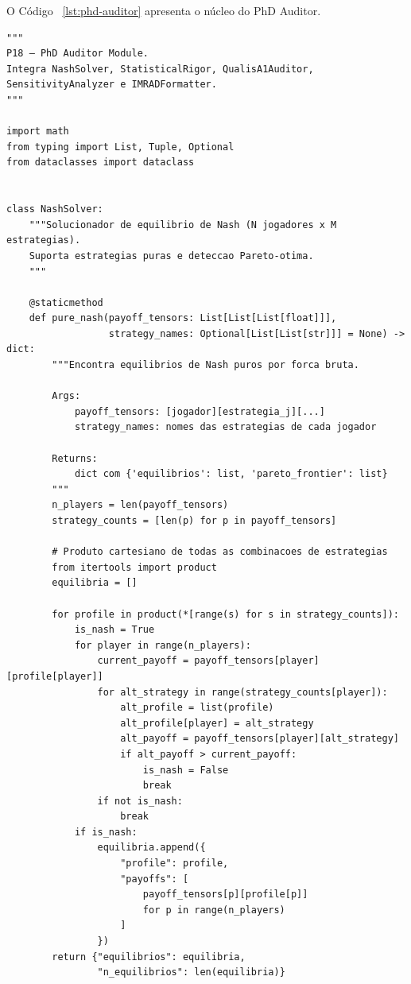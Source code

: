 O Código~ \ref{lst:phd-auditor} apresenta o núcleo do PhD Auditor.

\begin{lstlisting}[caption={phd\_auditor.py — NashSolver e StatisticalRigor},
label={lst:phd-auditor}, style=pythonstyle]
"""
P18 — PhD Auditor Module.
Integra NashSolver, StatisticalRigor, QualisA1Auditor,
SensitivityAnalyzer e IMRADFormatter.
"""

import math
from typing import List, Tuple, Optional
from dataclasses import dataclass


class NashSolver:
    """Solucionador de equilibrio de Nash (N jogadores x M estrategias).
    Suporta estrategias puras e deteccao Pareto-otima.
    """

    @staticmethod
    def pure_nash(payoff_tensors: List[List[List[float]]],
                  strategy_names: Optional[List[List[str]]] = None) -> dict:
        """Encontra equilibrios de Nash puros por forca bruta.
        
        Args:
            payoff_tensors: [jogador][estrategia_j][...]
            strategy_names: nomes das estrategias de cada jogador
        
        Returns:
            dict com {'equilibrios': list, 'pareto_frontier': list}
        """
        n_players = len(payoff_tensors)
        strategy_counts = [len(p) for p in payoff_tensors]
        
        # Produto cartesiano de todas as combinacoes de estrategias
        from itertools import product
        equilibria = []
        
        for profile in product(*[range(s) for s in strategy_counts]):
            is_nash = True
            for player in range(n_players):
                current_payoff = payoff_tensors[player][profile[player]]
                for alt_strategy in range(strategy_counts[player]):
                    alt_profile = list(profile)
                    alt_profile[player] = alt_strategy
                    alt_payoff = payoff_tensors[player][alt_strategy]
                    if alt_payoff > current_payoff:
                        is_nash = False
                        break
                if not is_nash:
                    break
            if is_nash:
                equilibria.append({
                    "profile": profile,
                    "payoffs": [
                        payoff_tensors[p][profile[p]]
                        for p in range(n_players)
                    ]
                })
        return {"equilibrios": equilibria,
                "n_equilibrios": len(equilibria)}
\end{lstlisting}

